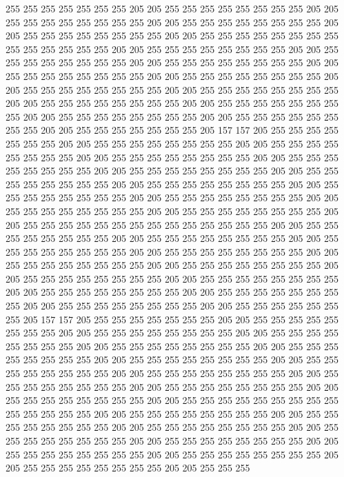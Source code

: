 255 255 255 255 255 255 255 205 205 255 255 255 255 255 255 255 255 205 205 255
255 255 255 255 255 255 255 205 205 255 255 255 255 255 255 255 255 205 205 255
255 255 255 255 255 255 255 205 205 255 255 255 255 255 255 255 255 255 255 255
255 255 255 205 205 255 255 255 255 255 255 255 255 205 205 255 255 255 255 255
255 255 255 205 205 255 255 255 255 255 255 255 255 205 205 255 255 255 255 255
255 255 255 205 205 255 255 255 255 255 255 255 255 205 205 255 255 255 255 255
255 255 255 205 205 255 255 255 255 255 255 255 255 205 205 255 255 255 255 255
255 255 255 205 205 255 255 255 255 255 255 255 255 205 205 255 255 255 255 255
255 255 255 205 205 255 255 255 255 255 255 255 255 205 205 255 255 255 255 255
255 255 205 157 157 205 255 255 255 255 255 255 255 205 205 255 255 255 255 255
255 255 255 205 205 255 255 255 255 255 255 255 255 205 205 255 255 255 255 255
255 255 255 205 205 255 255 255 255 255 255 255 255 205 205 255 255 255 255 255
255 255 255 205 205 255 255 255 255 255 255 255 255 205 205 255 255 255 255 255
255 255 255 205 205 255 255 255 255 255 255 255 255 205 205 255 255 255 255 255
255 255 255 205 205 255 255 255 255 255 255 255 255 205 205 255 255 255 255 255
255 255 255 205 205 255 255 255 255 255 255 255 255 255 255 255 255 255 255 205
205 255 255 255 255 255 255 255 255 205 205 255 255 255 255 255 255 255 255 205
205 255 255 255 255 255 255 255 255 205 205 255 255 255 255 255 255 255 255 205
205 255 255 255 255 255 255 255 255 205 205 255 255 255 255 255 255 255 255 205
205 255 255 255 255 255 255 255 255 205 205 255 255 255 255 255 255 255 255 205
205 255 255 255 255 255 255 255 255 205 205 255 255 255 255 255 255 255 255 205
205 255 255 255 255 255 255 255 255 205 205 255 255 255 255 255 255 255 205 157
157 205 255 255 255 255 255 255 255 205 205 255 255 255 255 255 255 255 255 205
205 255 255 255 255 255 255 255 255 205 205 255 255 255 255 255 255 255 255 205
205 255 255 255 255 255 255 255 255 205 205 255 255 255 255 255 255 255 255 205
205 255 255 255 255 255 255 255 255 205 205 255 255 255 255 255 255 255 255 205
205 255 255 255 255 255 255 255 255 205 205 255 255 255 255 255 255 255 255 205
205 255 255 255 255 255 255 255 255 205 205 255 255 255 255 255 255 255 255 205
205 255 255 255 255 255 255 255 255 255 255 255 255 255 255 205 205 255 255 255
255 255 255 255 255 205 205 255 255 255 255 255 255 255 255 205 205 255 255 255
255 255 255 255 255 205 205 255 255 255 255 255 255 255 255 205 205 255 255 255
255 255 255 255 255 205 205 255 255 255 255 255 255 255 255 205 205 255 255 255
255 255 255 255 255 205 205 255 255 255 255 255 255 255 255 205 205 255 255 255
